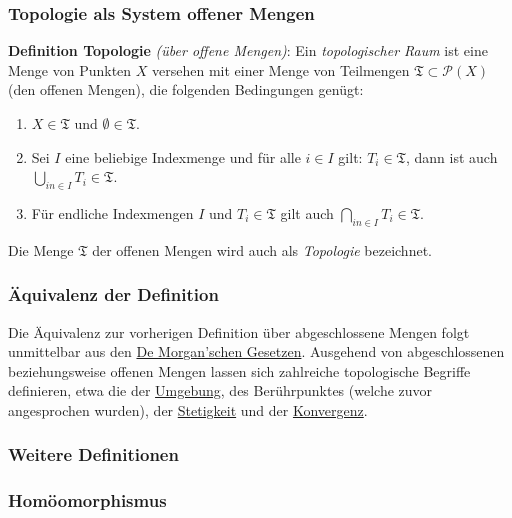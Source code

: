\documentclass[12pt,]{article}
\providecommand{\tightlist}{%
  \setlength{\itemsep}{0pt}\setlength{\parskip}{0pt}}
\begin{document}
\subsubsection{Topologie als System offener
Mengen}\label{topologie-als-system-offener-mengen}

\textbf{Definition Topologie} \emph{(über offene Mengen)}: Ein
\emph{topologischer Raum} ist eine Menge von Punkten \(X\) versehen mit
einer Menge von Teilmengen
\(\mathfrak{T} \subset \mathcal{P}\left(X\right)\) (den offenen Mengen),
die folgenden Bedingungen genügt:

\begin{enumerate}
\tightlist
\item
  \(X \in \mathfrak{T}\) und \(\emptyset \in \mathfrak{T}\).
\item
  Sei \(I\) eine beliebige Indexmenge und für alle \(i \in I\) gilt:
  \(T_i \in \mathfrak{T}\), dann ist auch
  \(\displaystyle\bigcup_{in \in I} T_i \in \mathfrak{T}\).
\item
  Für endliche Indexmengen \(I\) und \(T_i \in \mathfrak{T}\) gilt auch
  \(\displaystyle\bigcap_{in \in I} T_i \in \mathfrak{T}\).
\end{enumerate}

Die Menge \(\mathfrak{T}\) der offenen Mengen wird auch als
\emph{Topologie} bezeichnet.

\subsubsection{Äquivalenz der
Definition}\label{uxe4quivalenz-der-definition}

Die Äquivalenz zur vorherigen Definition über abgeschlossene Mengen
folgt unmittelbar aus den \href{De_Morgan’sche_Gesetze}{De Morgan'schen
Gesetzen}. Ausgehend von abgeschlossenen beziehungsweise offenen Mengen
lassen sich zahlreiche topologische Begriffe definieren, etwa die der
\href{Umgebung_(Mathematik)}{Umgebung}, des Berührpunktes (welche zuvor
angesprochen wurden), der \href{Stetigkeit_(Topologie)}{Stetigkeit} und
der \href{Konvergenz_(Mathematik)}{Konvergenz}.

\subsubsection{Weitere Definitionen}\label{weitere-definitionen}

\subsubsection{Homöomorphismus}\label{homuxf6omorphismus-1}
\end{document}

